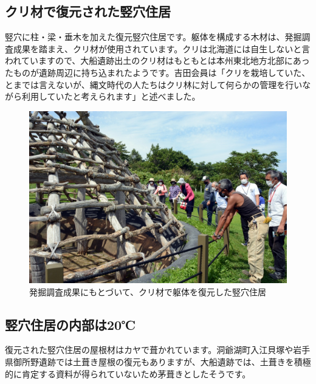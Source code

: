 \documentclass[a4j,11pt,twocolumn,openany]{jsbook}
\begin{document}
\subsection{クリ材で復元された竪穴住居}

竪穴に柱・梁・垂木を加えた復元竪穴住居です。躯体を構成する木材は、発掘調査成果を踏まえ、クリ材が使用されています。クリは北海道には自生しないと言われていますので、大船遺跡出土のクリ材はもともとは本州東北地方北部にあったものが遺跡周辺に持ち込まれたようです。吉田会員は「クリを栽培していた、とまでは言えないが、縄文時代の人たちはクリ林に対して何らかの管理を行いながら利用していたと考えられます」と述べました。

\begin{figure}[ht]
	\centering
	\includegraphics[width=\linewidth]{fig/01_Iseki_kengaku/04_Ofune_house.JPG}
	\caption{発掘調査成果にもとづいて、クリ材で躯体を復元した竪穴住居}
	\label{}
\end{figure}

\subsection{竪穴住居の内部は20℃}

復元された竪穴住居の屋根材はカヤで葺かれています。洞爺湖町入江貝塚や岩手県御所野遺跡では土葺き屋根の復元もありますが、大船遺跡では、土葺きを積極的に肯定する資料が得られていないため茅葺きとしたそうです。
\end{document}

